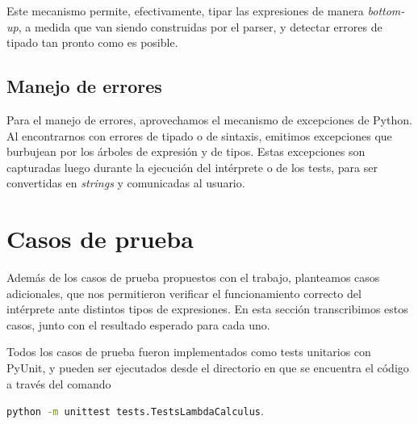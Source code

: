 \documentclass[11pt]{article}
\begin{document}
Este mecanismo permite, efectivamente, tipar las expresiones de manera
\emph{bottom-up}, a medida que van siendo construidas por el parser, y
detectar errores de tipado tan pronto como es posible.

\subsection{Manejo de errores}

Para el manejo de errores, aprovechamos el mecanismo de excepciones de Python. Al encontrarnos con errores de tipado o de sintaxis, emitimos excepciones que burbujean por los árboles de expresión y de tipos. Estas excepciones son capturadas luego durante la ejecución del intérprete o de los tests, para ser convertidas en \emph{strings} y comunicadas al usuario.


\section{Casos de prueba}


Además de los casos de prueba propuestos con el trabajo, planteamos casos
adicionales, que nos permitieron verificar el funcionamiento correcto del
intérprete ante distintos tipos de expresiones. En esta sección transcribimos
estos casos, junto con el resultado esperado para cada uno.

Todos los casos de prueba fueron implementados como tests unitarios con
PyUnit, y pueden ser ejecutados desde el directorio en que se encuentra el
código a través del comando
\begin{center}\lstinline[language=bash]
	{python -m unittest tests.TestsLambdaCalculus}.
\end{center}
\end{document}
